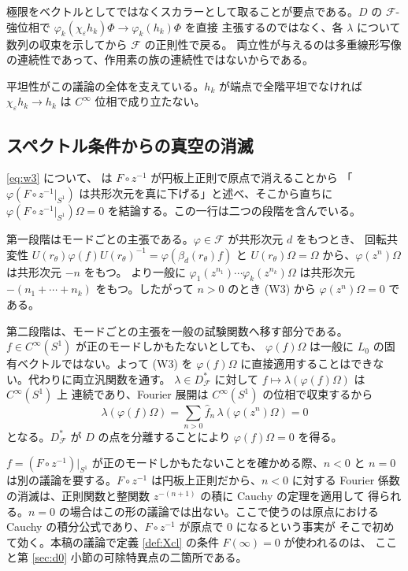 \documentclass[11pt,a4paper]{article}
\newcommand{\Circ}{S^{1}}
\newcommand{\Fields}{\mathcal{F}}
\newcommand{\Dom}{D}
\newcommand{\Dstar}{\Dom^{*}_{\Fields}}
\theoremstyle{definition}
\begin{document}
極限をベクトルとしてではなくスカラーとして取ることが要点である。$\Dom$ の
$\Fields$-強位相で $\varphi_k(\chi_\varepsilon h_k)\Phi \to \varphi_k(h_k)\Phi$ を直接
主張するのではなく、各 $\lambda$ について数列の収束を示してから $\Fields$ の正則性で戻る。
両立性が与えるのは多重線形写像の連続性であって、作用素の族の連続性ではないからである。

平坦性がこの議論の全体を支えている。$h_k$ が端点で全階平坦でなければ
$\chi_\varepsilon h_k \to h_k$ は $C^\infty$ 位相で成り立たない。

\subsection{スペクトル条件からの真空の消滅}
\label{sec:w3}

\eqref{eq:w3} について、\cite{T26} は $F \circ z^{-1}$ が円板上正則で原点で消えることから
「$\varphi(F \circ z^{-1}|_{\Circ})$ は共形次元を真に下げる」と述べ、そこから直ちに
$\varphi(F\circ z^{-1}|_{\Circ})\Omega = 0$ を結論する。この一行は二つの段階を含んでいる。

第一段階はモードごとの主張である。$\varphi \in \Fields$ が共形次元 $d$ をもつとき、
回転共変性 $U(r_\theta)\varphi(f)U(r_\theta)^{-1} = \varphi(\beta_d(r_\theta)f)$ と
$U(r_\theta)\Omega = \Omega$ から、$\varphi(z^n)\Omega$ は共形次元 $-n$ をもつ。
より一般に $\varphi_1(z^{n_1})\cdots\varphi_k(z^{n_k})\Omega$ は共形次元
$-(n_1 + \cdots + n_k)$ をもつ。したがって $n > 0$ のとき (W3) から
$\varphi(z^n)\Omega = 0$ である。

第二段階は、モードごとの主張を一般の試験関数へ移す部分である。$f \in C^\infty(\Circ)$ が正のモードしかもたないとしても、
$\varphi(f)\Omega$ は一般に $L_0$ の固有ベクトルではない。よって (W3) を
$\varphi(f)\Omega$ に直接適用することはできない。代わりに両立汎関数を通す。
$\lambda \in \Dstar$ に対して $f \mapsto \lambda(\varphi(f)\Omega)$ は $C^\infty(\Circ)$ 上
連続であり、Fourier 展開は $C^\infty(\Circ)$ の位相で収束するから
\[
  \lambda(\varphi(f)\Omega) = \sum_{n > 0} \hat{f}_n\, \lambda(\varphi(z^n)\Omega) = 0
\]
となる。$\Dstar$ が $\Dom$ の点を分離することにより $\varphi(f)\Omega = 0$ を得る。

$f = (F\circ z^{-1})|_{\Circ}$ が正のモードしかもたないことを確かめる際、$n < 0$ と
$n = 0$ は別の議論を要する。$F\circ z^{-1}$ は円板上正則だから、$n < 0$ に対する
Fourier 係数の消滅は、正則関数と整関数 $z^{-(n+1)}$ の積に Cauchy の定理を適用して
得られる。$n = 0$ の場合はこの形の議論では出ない。ここで使うのは原点における
Cauchy の積分公式であり、$F\circ z^{-1}$ が原点で $0$ になるという事実が
そこで初めて効く。本稿の議論で定義 \ref{def:Xcl} の条件 $F(\infty) = 0$ が使われるのは、
ここと第 \ref{sec:d0} 小節の可除特異点の二箇所である。
\end{document}
